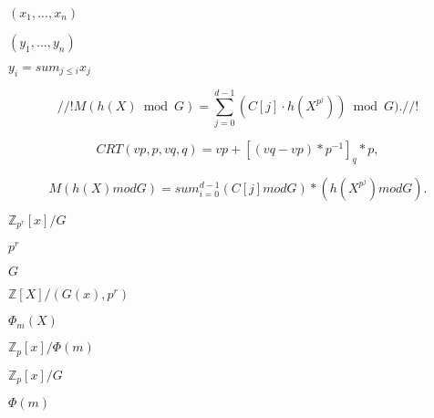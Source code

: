 \documentclass{article}
\begin{document}
$(x_1, ..., x_n)$
\pagebreak

$(y_1, ..., y_n)$
\pagebreak

$y_i = sum_{j\le i} x_j$
\pagebreak

\[ //! M(h(X) \bmod G)= \sum_{j=0}^{d-1}(C[j] \cdot h(X^{p^j}))\bmod G). //! \]
\pagebreak

\[ CRT(vp,p,vq,q) = vp + [(vq-vp) * p^{-1}]_q * p, \]
\pagebreak

\[ M(h(X) mod G) = sum_{i=0}^{d-1} (C[j] mod G) * (h(X^{p^j}) mod G).\]
\pagebreak

$\mathbb{Z}_{p^r}[x]/G$
\pagebreak

$p^r$
\pagebreak

$ G$
\pagebreak

$\mathbb{Z}[X]/(G(x),p^r)$
\pagebreak

$\Phi_m(X)$
\pagebreak

$\mathbb{Z}_p[x]/\Phi(m)$
\pagebreak

$\mathbb{Z}_p[x]/G$
\pagebreak

$\Phi(m)$
\pagebreak
\end{document}

